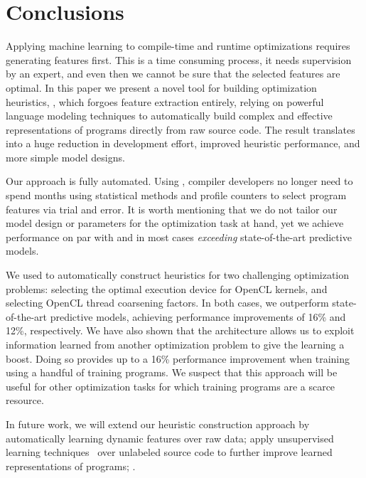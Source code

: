 \section{Conclusions} \label{sec:conclusion}

Applying machine learning to compile-time and runtime optimizations requires generating features first. This is a time consuming process, it needs supervision by an expert, and even then we cannot be sure that the selected features are optimal. In this paper we present a novel tool for building optimization heuristics, \DeepTune, which forgoes feature extraction entirely, relying on powerful language modeling techniques to automatically build complex and effective representations of programs directly from raw source code. The result translates into a huge reduction in development effort, improved heuristic performance, and more simple model designs.

Our approach is fully automated. Using \DeepTune, compiler developers no longer need to spend months using statistical methods and profile counters to select program features via trial and error.  It is worth mentioning that we do not tailor our model design or parameters for the optimization task at hand, yet we achieve performance on par with and in most cases \emph{exceeding} state-of-the-art predictive models.

We used \DeepTune to automatically construct heuristics for two challenging optimization problems: selecting the optimal execution device for OpenCL kernels, and selecting OpenCL thread coarsening factors. In both cases, we outperform state-of-the-art predictive models, achieving performance improvements of 16\% and 12\%, respectively. We have also shown that the \DeepTune architecture allows us to exploit information learned from another optimization problem to give the learning a boost. Doing so provides up to a 16\% performance improvement when training using a handful of training programs. We suspect that this approach will be useful for other optimization tasks for which training programs are a scarce resource.

In future work, we will extend our heuristic construction approach by automatically learning dynamic features over raw data; apply unsupervised learning techniques~\cite{Le2012} over unlabeled source code to further improve learned representations of programs; .
